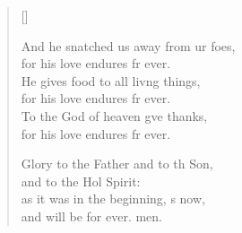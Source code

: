 \begin{verse}[\versewidth]
\begin{patverse}
And he snatched us away from ur foes,\Med\\
    for his love endures fr ever.\\
He gives food to all liv\pointup{\i}ng things,\Med\\
    for his love endures fr ever.\\
To the God of heaven g\pointup{\i}ve thanks,\Med\\
    for his love endures fr ever.

Glory to the Father and to th Son,\Med\\
    and to the Hol Spirit:\\
as it was in the beginning, \pointup{\i}s now,\Med\\
    and will be for ever. men.
  \end{patverse}
\end{verse}
